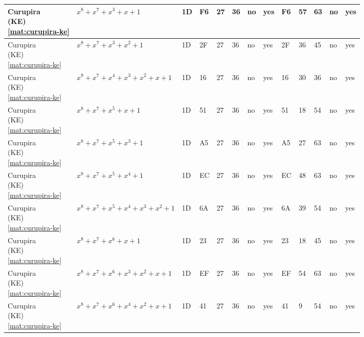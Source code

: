 \begin{tiny}
\begin{longtable}{|l|l|l|l|l|l|l|l|l|l|l|l|l|}
\shortstack{Curupira \\ (KE) \\ \eqref{mat:curupira-ke}} & $x^8 + x^7 + x^3 + x + 1$ & 1D & F6 & 27 & 36 & no & yes & F6 & 57 & 63 & no & yes \\ \hline
\shortstack{Curupira \\ (KE) \\ \eqref{mat:curupira-ke}} & $x^8 + x^7 + x^3 + x^2 + 1$ & 1D & 2F & 27 & 36 & no & yes & 2F & 36 & 45 & no & yes \\ \hline
\shortstack{Curupira \\ (KE) \\ \eqref{mat:curupira-ke}} & $x^8 + x^7 + x^4 + x^3 + x^2 + x + 1$ & 1D & 16 & 27 & 36 & no & yes & 16 & 30 & 36 & no & yes \\ \hline
\shortstack{Curupira \\ (KE) \\ \eqref{mat:curupira-ke}} & $x^8 + x^7 + x^5 + x + 1$ & 1D & 51 & 27 & 36 & no & yes & 51 & 18 & 54 & no & yes \\ \hline
\shortstack{Curupira \\ (KE) \\ \eqref{mat:curupira-ke}} & $x^8 + x^7 + x^5 + x^3 + 1$ & 1D & A5 & 27 & 36 & no & yes & A5 & 27 & 63 & no & yes \\ \hline
\shortstack{Curupira \\ (KE) \\ \eqref{mat:curupira-ke}} & $x^8 + x^7 + x^5 + x^4 + 1$ & 1D & EC & 27 & 36 & no & yes & EC & 48 & 63 & no & yes \\ \hline
\shortstack{Curupira \\ (KE) \\ \eqref{mat:curupira-ke}} & $x^8 + x^7 + x^5 + x^4 + x^3 + x^2 + 1$ & 1D & 6A & 27 & 36 & no & yes & 6A & 39 & 54 & no & yes \\ \hline
\shortstack{Curupira \\ (KE) \\ \eqref{mat:curupira-ke}} & $x^8 + x^7 + x^6 + x + 1$ & 1D & 23 & 27 & 36 & no & yes & 23 & 18 & 45 & no & yes \\ \hline
\shortstack{Curupira \\ (KE) \\ \eqref{mat:curupira-ke}} & $x^8 + x^7 + x^6 + x^3 + x^2 + x + 1$ & 1D & EF & 27 & 36 & no & yes & EF & 54 & 63 & no & yes \\ \hline
\shortstack{Curupira \\ (KE) \\ \eqref{mat:curupira-ke}} & $x^8 + x^7 + x^6 + x^4 + x^2 + x + 1$ & 1D & 41 & 27 & 36 & no & yes & 41 & 9 & 54 & no & yes \\ \hline

\end{longtable}
\end{tiny}
